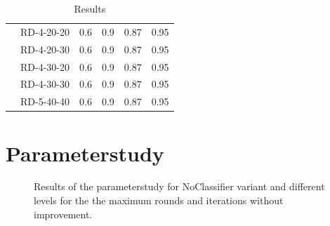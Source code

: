 \begin{table}[ht]
\begin{tabular}{c c c c c c}
                                        & RD-4-20-20 & 0.6             & 0.9         & 0.87     & 0.95     \\
                                        & RD-4-20-30 & 0.6             & 0.9         & 0.87     & 0.95     \\
                                        & RD-4-30-20 & 0.6             & 0.9         & 0.87     & 0.95     \\
                                        & RD-4-30-30 & 0.6             & 0.9         & 0.87     & 0.95     \\
                                        & RD-5-40-40 & 0.6             & 0.9         & 0.87     & 0.95     \\
        \bottomrule
    \end{tabular}
    \caption{Results}
    \label{tab:dataset_model_selection_randomStrategy}
\end{table}

\chapter{Parameterstudy}

\begin{figure}[ht]
    \centering
    \caption{Results of the parameterstudy for NoClassifier variant and different levels for the the maximum rounds and iterations without improvement.}
    \label{fig:aggregated_base_parameter_study_appendix}
\end{figure}